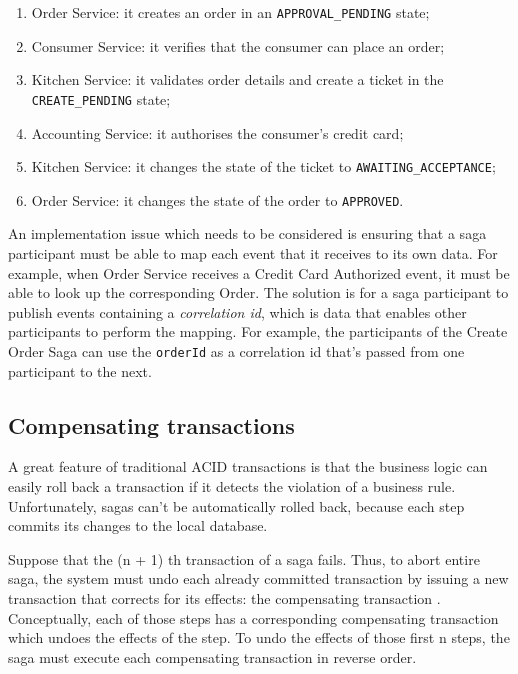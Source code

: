 \documentclass[conference]{IEEEtran}
\begin{document}
\begin{enumerate}
  \item Order Service: it creates an order in an \texttt{APPROVAL\_PENDING} state;
  \item Consumer Service: it verifies that the consumer can place an order;
  \item Kitchen Service: it validates order details and create a ticket in the \texttt{CREATE\_PENDING} state;
  \item Accounting Service: it authorises the consumer's credit card;
  \item Kitchen Service: it changes the state of the ticket to \texttt{AWAITING\_ACCEPTANCE};
  \item Order Service: it changes the state of the order to \texttt{APPROVED}.
\end{enumerate}

An implementation issue which needs to be considered is ensuring that a saga participant must be able to map each event that it receives to its own data. For example, when Order Service receives a Credit Card Authorized event, it must be able to look up the corresponding Order. The solution is for a saga participant to publish events containing a \textit{correlation id}, which is data that enables other participants to perform the mapping. For example, the participants of the Create Order Saga can use the \texttt{orderId} as a correlation id that's passed from one participant to the next.

\subsection{Compensating transactions}

A great feature of traditional ACID transactions is that the business logic can easily roll back a transaction if it detects the violation of a business rule. Unfortunately, sagas can't be automatically rolled back, because each step commits its changes to the local database. 

Suppose that the (n + 1) th transaction of a saga fails. Thus, to abort entire saga, the system must undo each already committed transaction by issuing a new transaction that corrects for its effects: the compensating transaction \cite{compensating}. Conceptually, each of those steps has a corresponding compensating transaction which undoes the effects of the step. To undo the effects of those first n steps, the saga must execute each compensating transaction in reverse order.
\end{document}
